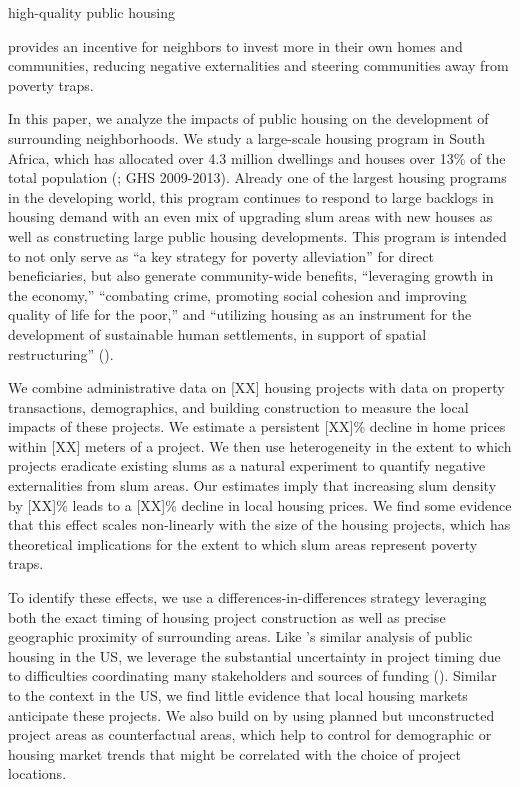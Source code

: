 \documentclass[12pt]{article}
\begin{document}
high-quality public housing 


provides an incentive for neighbors to invest more in their own homes and communities, reducing negative externalities and steering communities away from poverty traps.

In this paper, we analyze the impacts of public housing on the development of surrounding neighborhoods.  We study a large-scale housing program in South Africa, which has allocated over 4.3 million dwellings and houses over 13\% of the total population (\cite{dhsreports}; GHS 2009-2013).  Already one of the largest housing programs in the developing world, this program continues to respond to large backlogs in housing demand with an even mix of upgrading slum areas with new houses as well as constructing large public housing developments.  This program is intended to not only serve as ``a key strategy for poverty alleviation'' for direct beneficiaries, but also generate community-wide benefits, ``leveraging growth in the economy,'' ``combating crime, promoting social cohesion and improving quality of life for the poor,'' and ``utilizing housing as an instrument for the development of sustainable human settlements, in support of spatial restructuring'' (\cite{bng}). 

We combine administrative data on [XX] housing projects with data on property transactions, demographics, and building construction to measure the local impacts of these projects.  We estimate a persistent [XX]\% decline in home prices within [XX] meters of a project.  We then use heterogeneity in the extent to which projects eradicate existing slums as a natural experiment to quantify negative externalities from slum areas.  Our estimates imply that increasing slum density by [XX]\% leads to a [XX]\% decline in local housing prices.  We find some evidence that this effect scales non-linearly with the size of the housing projects, which has theoretical implications for the extent to which slum areas represent poverty traps.

To identify these effects, we use a differences-in-differences strategy leveraging both the exact timing of housing project construction as well as precise geographic proximity of surrounding areas.  Like \cite{diamond2016wants}'s similar analysis of public housing in the US, we leverage the substantial uncertainty in project timing due to difficulties coordinating many stakeholders and sources of funding (\cite{serihistory}).  Similar to the context in the US, we find little evidence that local housing markets anticipate these projects.  We also build on \cite{diamond2016wants} by using planned but unconstructed project areas as counterfactual areas, which help to control for demographic or housing market trends that might be correlated with the choice of project locations.
\end{document}
